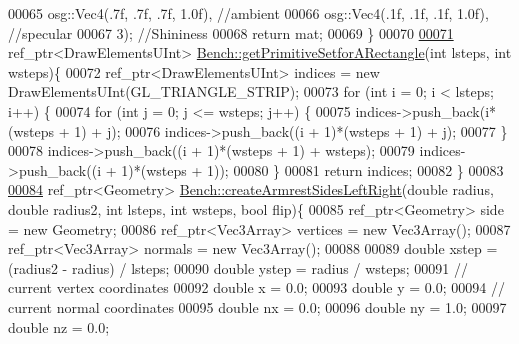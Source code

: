 \begin{DoxyCode}
00065                                 osg::Vec4(.7f, .7f, .7f, 1.0f), \textcolor{comment}{//ambient}
00066                                 osg::Vec4(.1f, .1f, .1f, 1.0f), \textcolor{comment}{//specular}
00067                                 3); \textcolor{comment}{//Shininess}
00068         \textcolor{keywordflow}{return} mat;
00069     \}
00070 
\hypertarget{_bench_8cpp_source_l00071}{}\hyperlink{classbrtr_1_1_bench_a90c4ae616eb8d7bf669af2983ed3cd1d}{00071}     ref\_ptr<DrawElementsUInt> \hyperlink{classbrtr_1_1_bench_a90c4ae616eb8d7bf669af2983ed3cd1d}{Bench::getPrimitiveSetforARectangle}(\textcolor{keywordtype}{int} 
      lsteps, \textcolor{keywordtype}{int} wsteps)\{
00072         ref\_ptr<DrawElementsUInt> indices = \textcolor{keyword}{new} DrawElementsUInt(GL\_TRIANGLE\_STRIP);
00073         \textcolor{keywordflow}{for} (\textcolor{keywordtype}{int} i = 0; i < lsteps; i++) \{
00074             \textcolor{keywordflow}{for} (\textcolor{keywordtype}{int} j = 0; j <= wsteps; j++) \{
00075                 indices->push\_back(i*(wsteps + 1) + j);
00076                 indices->push\_back((i + 1)*(wsteps + 1) + j);
00077             \}
00078             indices->push\_back((i + 1)*(wsteps + 1) + wsteps);
00079             indices->push\_back((i + 1)*(wsteps + 1));
00080         \}
00081         \textcolor{keywordflow}{return} indices;
00082     \}
00083 
\hypertarget{_bench_8cpp_source_l00084}{}\hyperlink{classbrtr_1_1_bench_afac56bea39f6e5e72140d4512dd711d3}{00084}     ref\_ptr<Geometry> \hyperlink{classbrtr_1_1_bench_afac56bea39f6e5e72140d4512dd711d3}{Bench::createArmrestSidesLeftRight}(\textcolor{keywordtype}{double} radius, \textcolor{keywordtype}{
      double} radius2, \textcolor{keywordtype}{int} lsteps, \textcolor{keywordtype}{int} wsteps, \textcolor{keywordtype}{bool} flip)\{
00085         ref\_ptr<Geometry> side = \textcolor{keyword}{new} Geometry;
00086         ref\_ptr<Vec3Array> vertices = \textcolor{keyword}{new} Vec3Array();
00087         ref\_ptr<Vec3Array> normals = \textcolor{keyword}{new} Vec3Array();       
00088 
00089         \textcolor{keywordtype}{double} xstep = (radius2 - radius) / lsteps;
00090         \textcolor{keywordtype}{double} ystep = radius / wsteps;
00091         \textcolor{comment}{// current vertex coordinates}
00092         \textcolor{keywordtype}{double} x = 0.0;
00093         \textcolor{keywordtype}{double} y = 0.0;
00094         \textcolor{comment}{//  current normal coordinates}
00095         \textcolor{keywordtype}{double} nx = 0.0;
00096         \textcolor{keywordtype}{double} ny = 1.0;
00097         \textcolor{keywordtype}{double} nz = 0.0;

\end{DoxyCode}
